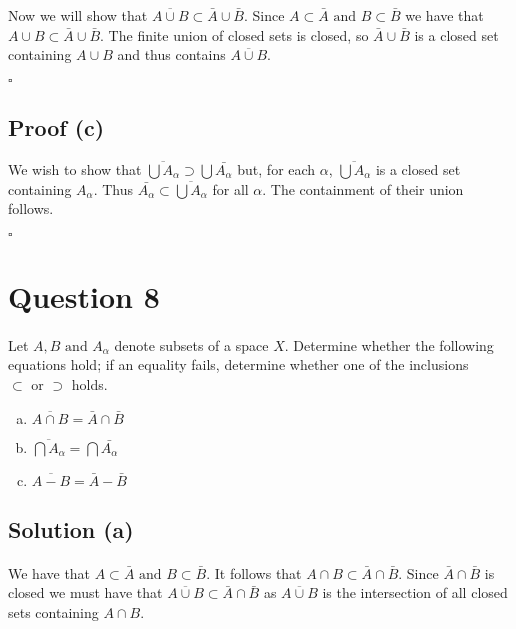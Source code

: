 \documentclass[11pt, oneside]{article}   	%
\newcommand{\tand}{\text{ and }}
\newcommand{\tor}{\text{ or }}
\newcommand{\qed}{\begin{center}
$\square$
\end{center}}
\begin{document}
Now we will show that $\overline{A \cup B} \subset \bar{A} \cup \bar{B}$. Since $A \subset \bar{A} \tand B \subset \bar{B}$ we have that $A \cup B \subset \bar{A} \cup \bar{B}$. The finite union of closed sets is closed, so $\bar{A} \cup \bar{B}$ is a closed set containing $A \cup B$ and thus contains $\overline{A \cup B} $. \qed
\par{}

\subsection*{Proof (c)}

We wish to show that $\overline{\bigcup A_\alpha} \supset \bigcup \bar{A_\alpha}$ but, for each $\alpha$, $\overline{\bigcup A_\alpha}$ is a closed set containing $A_\alpha$. Thus $\bar{A_\alpha} \subset \overline{\bigcup A_\alpha}$ for all $\alpha$. The containment of their union follows. \qed


\section*{Question 8}
\paragraph{}

Let $A, B \tand A_{\alpha}$ denote subsets of a space $X$. Determine whether the following equations hold; if an equality fails, determine whether one of the inclusions $\subset \tor \supset$ holds.
\begin{enumerate}[(a)]

\item
$\overline{A \cap B} = \bar{A} \cap \bar{B}$
\item
$\overline{\bigcap A_\alpha} = \bigcap \bar{A_\alpha}$
\item
$\overline{A - B} = \bar{A} - \bar{B}$

\end{enumerate}

\subsection*{Solution (a)}
\paragraph{}

We have that $A \subset \bar{A} \tand B \subset \bar{B}$. It follows that $A \cap B \subset \bar{A} \cap \bar{B}$. Since $\bar{A} \cap \bar{B}$ is closed we must have that $\overline{A \cup B} \subset \bar{A} \cap \bar{B}$ as $\overline{A \cup B}$ is the intersection of all closed sets containing $A \cap B$.
\end{document}
